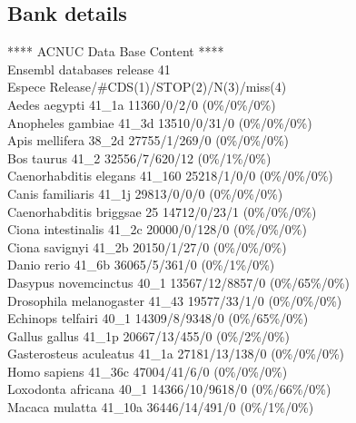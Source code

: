 \documentclass{article}
\begin{document}
\begin{Schunk}
\subsection{Bank details}
            ****     ACNUC Data Base Content      ****   \\
                 Ensembl databases release 41        \\
Espece                                  Release/\#CDS(1)/STOP(2)/N(3)/miss(4)\\
Aedes aegypti                           41\_1a 11360/0/2/0 (0\%/0\%/0\%)\\
Anopheles gambiae                       41\_3d 13510/0/31/0 (0\%/0\%/0\%)\\
Apis mellifera                          38\_2d 27755/1/269/0 (0\%/0\%/0\%)\\
Bos taurus                              41\_2 32556/7/620/12 (0\%/1\%/0\%)\\
Caenorhabditis elegans                  41\_160 25218/1/0/0 (0\%/0\%/0\%)\\
Canis familiaris                        41\_1j 29813/0/0/0 (0\%/0\%/0\%)\\
Caenorhabditis briggsae                 25 14712/0/23/1 (0\%/0\%/0\%)\\
Ciona intestinalis                      41\_2c 20000/0/128/0 (0\%/0\%/0\%)\\
Ciona savignyi                          41\_2b 20150/1/27/0 (0\%/0\%/0\%)\\
Danio rerio                             41\_6b 36065/5/361/0 (0\%/1\%/0\%)\\
Dasypus novemcinctus                    40\_1 13567/12/8857/0 (0\%/65\%/0\%)\\
Drosophila melanogaster                 41\_43 19577/33/1/0 (0\%/0\%/0\%)\\
Echinops telfairi                       40\_1 14309/8/9348/0 (0\%/65\%/0\%)\\
Gallus gallus                           41\_1p 20667/13/455/0 (0\%/2\%/0\%)\\
Gasterosteus aculeatus                  41\_1a 27181/13/138/0 (0\%/0\%/0\%)\\
Homo sapiens                            41\_36c 47004/41/6/0 (0\%/0\%/0\%)\\
Loxodonta africana                      40\_1 14366/10/9618/0 (0\%/66\%/0\%)\\
Macaca mulatta                          41\_10a 36446/14/491/0 (0\%/1\%/0\%)\\

\end{Schunk}
\end{document}
